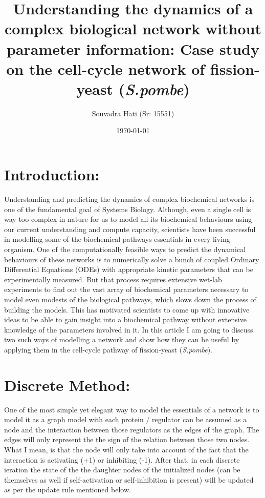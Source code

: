 \documentclass{article}
\title{Understanding the dynamics of a complex biological network without 
parameter information: Case study on the cell-cycle network 
of fission-yeast (\textit{S.pombe})}
\author{Souvadra Hati (Sr: 15551)}
\date\today
\begin{document}
\maketitle %

\section*{Introduction:} Understanding and predicting the dynamics of complex 
biochemical networks is one of the fundamental goal of Systems Biology. Although,
even a single cell is way too complex in nature for us to model all its 
biochemical behaviours using our current understanding and compute capacity,
scientists have been successful in modelling some of the biochemical pathways
essentials in every living organism. One of the computationally feasible ways 
to predict the dynamical behaviours of these networks is to numerically solve a bunch of 
coupled Ordinary Differential Equations (ODEs) with appropriate kinetic parameters 
that can be experimentally measured. But that process requires extensive wet-lab
experiments to find out the vast array of biochemical parameters necessary to 
model even modests of the biological pathways, which slows down the process of 
building the models. This has motivated scientists to come up with innovative 
ideas to be able to gain insight into a biochemical pathway without extensive 
knowledge of the parameters involved in it. In this article I am going to discuss
two such ways of modelling a network and show how they can be useful by applying 
them in the cell-cycle pathway of fission-yeast (\textit{S.pombe}).
\section*{Discrete Method:}
One of the most simple yet elegant way to model the essentials of a network is
to model it as a graph model with each protein / regulator can be assumed as 
a node and the interaction between those regulators as the edges of the graph.
The edges will only represent the the sign of the relation between those two nodes.
What I mean, is that the node will only take into account of the fact that 
the interaction is activating (+1) or inhibiting (-1). After that, in each 
discrete ieration the state of the the daughter nodes of the initialized nodes 
(can be themselves as well if self-activation or self-inhibition is present)
will be updated as per the update rule mentioned below.
\end{document}
